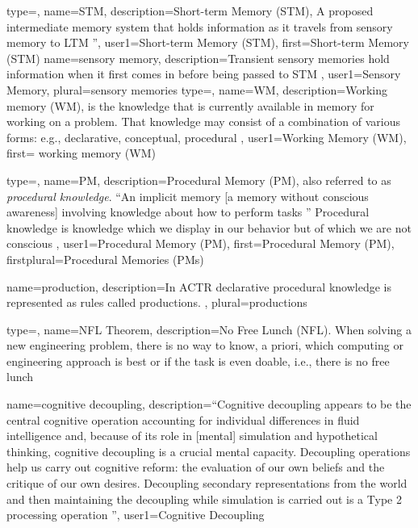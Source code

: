 {
  type=\acronymtype,
  name=STM,
  description={Short-term Memory (STM), A proposed intermediate memory system that holds information as it travels from \gls{sensory memory} to \gls{LTM} \citep[175]{anderson2005cognitive} ''},
  user1={Short-term Memory (STM)},
  first={Short-term Memory (STM)}
}
{
    name=sensory memory,
    description={Transient sensory memories hold information when it first comes in before being passed to \gls{STM}
    \citep[173]{anderson2005cognitive}},
    user1={Sensory Memory},
    plural={sensory memories}
}
{
  type=\acronymtype,
  name=WM,
  description={Working memory (WM), is the knowledge that is currently available in memory for working on a problem. That knowledge may consist of a combination of various forms: e.g., declarative, conceptual, procedural \citep{anderson2005cognitive, Stanovich2009IntTest}},
  user1={Working Memory (WM)},
  first= {working memory (WM)}
}

{
  type=\acronymtype,
  name=PM,
  description={Procedural Memory (PM), also referred to as \emph{procedural knowledge}. ``An implicit memory [a memory without conscious awareness] involving knowledge about how to perform tasks \citep[238]{anderson2005cognitive}'' Procedural knowledge is knowledge which we display in our behavior but of which we are not conscious \citep{anderson2005cognitive}},
  user1={Procedural Memory (PM)},
  first={Procedural Memory (PM)},
  firstplural={Procedural Memories (PMs)}
}

{
  name=production,
  description={In \gls{ACTR} declarative procedural knowledge is represented as rules called productions. \citep{ACTR_6Tutorial2012}},
  plural=productions
}

{
  type=\acronymtype,
  name=NFL Theorem,
  description={No Free Lunch (NFL). When solving a new engineering problem, there is no way to know, a priori, which computing or engineering approach is best or if the task is even doable, i.e., there is no free lunch \citep{Rogers2003Machinery}}
}

{
  name=cognitive decoupling,
  description={``Cognitive decoupling appears to be the central cognitive operation accounting for individual differences in fluid intelligence and, because of its role in [mental] simulation and hypothetical thinking, cognitive decoupling is a crucial mental capacity. Decoupling operations help us carry out cognitive reform: the evaluation of our own beliefs and the critique of our own desires. Decoupling secondary representations from the world and then maintaining the decoupling while simulation is carried out is a Type 2 processing operation \citep{Stanovich2009IntTest}''},
  user1={Cognitive Decoupling}
}

